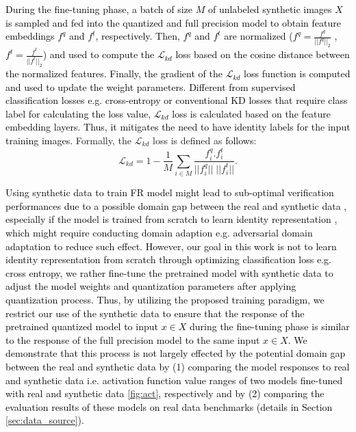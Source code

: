 \documentclass[a4paper,conference]{IEEEtran}
\begin{document}
\textcolor{black}{
During the fine-tuning phase, a batch of size $M$ of unlabeled synthetic images $X$ is sampled and fed into the quantized and full precision model to obtain feature embeddings $f^q$ and $f^t$, respectively.}
\textcolor{black}{
Then, $f^q$ and $f^t$ are normalized ($f^q=\frac{f^q}{||f^q||_2}$ ,$f^t=\frac{f^t}{||f^t||_2}$) and used to compute the $\mathcal{L}_{kd}$ loss based on the cosine distance between the normalized features.
Finally, the gradient of the $\mathcal{L}_{kd}$ loss function is computed and used to update the weight parameters. 
Different from supervised classification losses e.g. cross-entropy or conventional KD losses \cite{DBLP:journals/corr/HintonVD15} that require class label for calculating the loss value,  $\mathcal{L}_{kd}$ loss is calculated based on the feature embedding layers. Thus, it mitigates the need to have identity labels for the input training images.}
Formally, the $\mathcal{L}_{kd}$ loss is defined as \textcolor{black}{follows}:
\vspace{-2mm}
\begin{equation}
    \mathcal{L}_{kd}=1- \frac{1}{M}\sum\limits_{i \in M} \frac{f^q_i . f^t_i}{||f^q_i|| \;||f^t_i||}.
\end{equation}

\textcolor{black}{
Using synthetic data to train FR model might lead to sub-optimal verification performances \cite{Qiu_2021_ICCV} due to a possible domain gap between the real and synthetic data \cite{DBLP:conf/aaai/XuZNLWTZ20,DBLP:conf/cvpr/Sankaranarayanan18,DBLP:conf/cvpr/LeePYL20}, especially if the model is trained from scratch to learn identity representation \cite{Qiu_2021_ICCV}, which might require conducting domain adaption e.g. adversarial domain adaptation \cite{DBLP:conf/aaai/XuZNLWTZ20,Qiu_2021_ICCV} to reduce such effect.
However, our goal in this work is not to learn identity representation from scratch through optimizing classification loss e.g. cross entropy, we rather fine-tune the pretrained model with synthetic data to adjust the model weights and quantization parameters after applying quantization process. 
Thus, by utilizing the proposed training paradigm, we restrict our use of the synthetic data to ensure that the response of the pretrained quantized model to input $x \in X$ during the fine-tuning phase is similar to the response of the full precision model to the same input $x \in X$.
We demonstrate that this process is not largely effected by the potential domain gap between the real and synthetic data by (1) comparing the model responses to real and synthetic data i.e. activation function value ranges of two models fine-tuned with real and synthetic data \ref{fig:act}, respectively and by (2) comparing the evaluation results of these models on real data benchmarks (details in Section \ref{sec:data_source}). 
}
\end{document}
